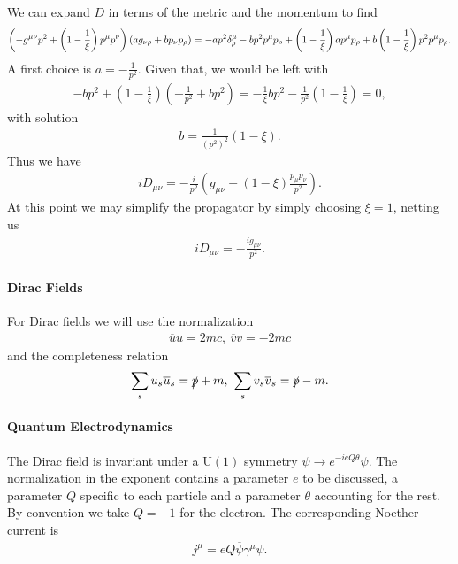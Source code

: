 We can expand $D$ in terms of the metric and the momentum to find
\begin{align*}
	\left(-g^{\mu\nu}p^{2} + \left(1 - \frac{1}{\xi}\right)p^{\mu}p^{\nu}\right)(ag_{\nu\rho} + bp_{\nu}p_{\rho}) = -ap^{2}\kdelta{\mu}{\rho} - bp^{2}p^{\mu}p_{\rho} + \left(1 - \frac{1}{\xi}\right)ap^{\mu}p_{\rho} + b\left(1 - \frac{1}{\xi}\right)p^{2}p^{\mu}p_{\rho}.
\end{align*}
A first choice is $a = -\frac{1}{p^{2}}$. Given that, we would be left with
\begin{align*}
	-bp^{2} + \left(1 - \frac{1}{\xi}\right)\left(-\frac{1}{p^{2}} + bp^{2}\right) = -\frac{1}{\xi}bp^{2} - \frac{1}{p^{2}}\left(1 - \frac{1}{\xi}\right) = 0,
\end{align*}
with solution
\begin{align*}
	b = \frac{1}{(p^{2})^{2}}(1 - \xi).
\end{align*}
Thus we have
\begin{align*}
	iD_{\mu\nu} = -\frac{i}{p^{2}}\left(g_{\mu\nu} - (1 - \xi)\frac{p_{\mu}p_{\nu}}{p^{2}}\right).
\end{align*}
At this point we may simplify the propagator by simply choosing $\xi = 1$, netting us
\begin{align*}
	iD_{\mu\nu} = -\frac{ig_{\mu\nu}}{p^{2}}.
\end{align*}

\paragraph{Dirac Fields}
For Dirac fields we will use the normalization
\begin{align*}
	\overline{u}u = 2mc,\ \overline{v}v = -2mc
\end{align*}
and the completeness relation
\begin{align*}
	\sum\limits_{s}u_{s}\overline{u}_{s} = \fsl{p} + m,\ \sum\limits_{s}v_{s}\overline{v}_{s} = \fsl{p} - m.
\end{align*}

\paragraph{Quantum Electrodynamics}
The Dirac field is invariant under a $\text{U}(1)$ symmetry $\psi\to e^{-ieQ\theta}\psi$. The normalization in the exponent contains a parameter $e$ to be discussed, a parameter $Q$ specific to each particle and a parameter $\theta$ accounting for the rest. By convention we take $Q = -1$ for the electron. The corresponding Noether current is
\begin{align*}
	j^{\mu} = eQ\overline{\psi}\gamma^{\mu}\psi.
\end{align*}

